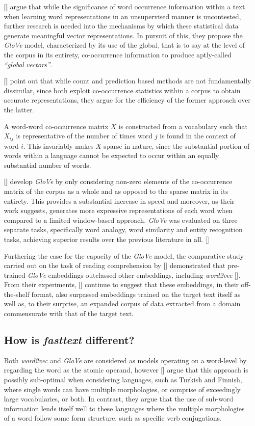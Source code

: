 \documentclass[12pt, a4paper]{report}
\theoremstyle{definition}
\theoremstyle{definition}%
\theoremstyle{definition}%
\theoremstyle{definition}%
\theoremstyle{definition}%
\theoremstyle{definition}%
\renewcommand{\cite}[1]{[\citealp{#1}]}
\begin{document}
\cite{pennington} argue that while the significance of word occurrence information within a text when learning word representations in an unsupervised manner is uncontested, further research is needed into the mechanisms by which these statistical data generate meaningful vector representations. In pursuit of this, they propose the \textit{GloVe} model, characterized by its use of the global, that is to say at the level of the corpus in its entirety, co-occurrence information to produce aptly-called \textit{\enquote{global vectors}}.

\cite{pennington} point out that while count and prediction based methods are not fundamentally dissimilar, since both exploit co-occurrence statistics within a corpus to obtain accurate representations, they argue for the efficiency of the former approach over the latter. 

A word-word co-occurrence matrix $X$ is constructed from a vocabulary such that $X_{ij}$ is representative of the number of times word $j$ is found in the context of word $i$. This invariably makes $X$ sparse in nature, since the substantial portion of words within a language cannot be expected to occur within an equally substantial number of words. 

\cite{pennington} develop \textit{GloVe} by only considering non-zero elements of the co-occurrence matrix of the corpus as a whole and as opposed to the sparse matrix in its entirety. This provides a substantial increase in speed and moreover, as their work suggests, generates more expressive representations of each word when compared to a limited window-based approach. \textit{GloVe} was evaluated on three separate tasks, specifically word analogy, word similarity and entity recognition tasks, achieving superior results over the previous literature in all. \cite{pennington}

Furthering the case for the capacity of the \textit{GloVe} model, the comparative study carried out on the task of reading comprehension by \cite{bhuwandhingra2017} demonstrated that pre-trained \textit{GloVe} embeddings outclassed other embeddings, including \textit{word2vec} \cite{mikolov2013}. From their experiments, \cite{bhuwandhingra2017} continue to suggest that these embeddings, in their off-the-shelf format, also surpassed embeddings trained on the target text itself as well as, to their surprise, an expanded corpus of data extracted from a domain commensurate with that of the target text.

\subsection{How is \textit{fasttext} different?}
Both \textit{word2vec} and \textit{GloVe} are considered as models operating on a word-level by regarding the word as the atomic operand, however \cite{bojanowski2017} argue that this approach is possibly sub-optimal when considering languages, such as Turkish and Finnish, where single words can have multiple morphologies, or comprise of exceedingly large vocabularies, or both. In contrast, they argue that the use of sub-word information lends itself well to these languages where the multiple morphologies of a word follow some form structure, such as specific verb conjugations. 
\end{document}
